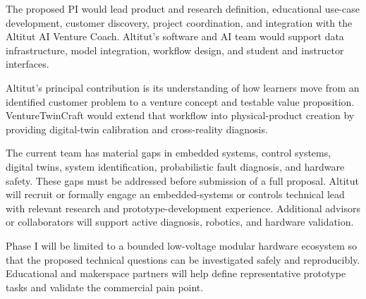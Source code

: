 The proposed PI would lead product and research definition, educational use-case development, customer discovery, project coordination, and integration with the Altitut AI Venture Coach. Altitut’s software and AI team would support data infrastructure, model integration, workflow design, and student and instructor interfaces.

Altitut’s principal contribution is its understanding of how learners move from an identified customer problem to a venture concept and testable value proposition. VentureTwinCraft would extend that workflow into physical-product creation by providing digital-twin calibration and cross-reality diagnosis.

The current team has material gaps in embedded systems, control systems, digital twins, system identification, probabilistic fault diagnosis, and hardware safety. These gaps must be addressed before submission of a full proposal. Altitut will recruit or formally engage an embedded-systems or controls technical lead with relevant research and prototype-development experience. Additional advisors or collaborators will support active diagnosis, robotics, and hardware validation.

Phase I will be limited to a bounded low-voltage modular hardware ecosystem so that the proposed technical questions can be investigated safely and reproducibly. Educational and makerspace partners will help define representative prototype tasks and validate the commercial pain point.


